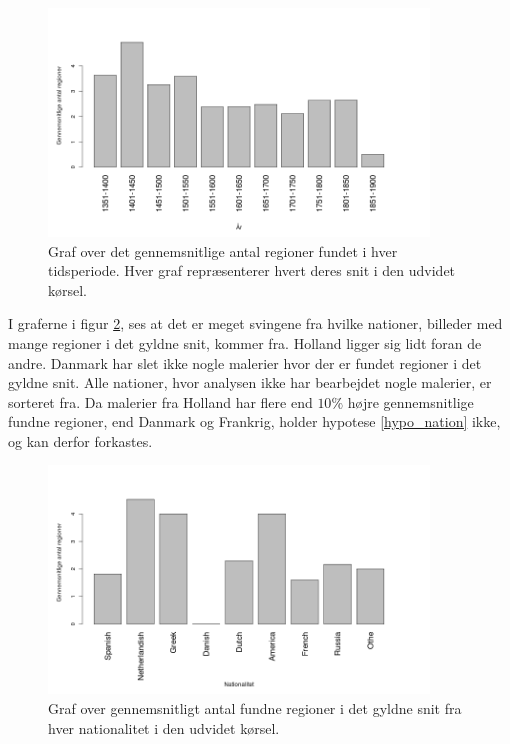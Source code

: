 {\begin{figure}[!h]
	\begin{center}
		\includegraphics[angle=0,width=0.90\textwidth]{afsnit/resultater/billeder/yearcutU.png}
	\end{center}
    \caption{Graf over det gennemsnitlige antal regioner fundet i hver
    tidsperiode. Hver graf repræsenterer hvert deres snit i den udvidet kørsel.}
	\label{udvidet_year}
\end{figure}

I graferne i figur \ref{udvidet_nation}, ses at det er meget svingene
fra hvilke nationer, billeder med mange regioner i det gyldne snit,
kommer fra. Holland ligger sig lidt foran de andre. Danmark har slet
ikke nogle malerier hvor der er fundet regioner i det gyldne snit. Alle
nationer, hvor analysen ikke har bearbejdet nogle malerier, er sorteret
fra. Da malerier fra Holland har flere end $10\%$ højre gennemsnitlige
fundne regioner, end Danmark og Frankrig, holder hypotese
\ref{hypo_nation} ikke, og kan derfor forkastes.

\begin{figure}[!h]
	\begin{center}
		\includegraphics[angle=0,width=0.90\textwidth]{afsnit/resultater/billeder/nationcutU.png}
	\end{center}
    \caption{Graf over gennemsnitligt antal fundne regioner i det gyldne
    snit fra hver nationalitet i den udvidet kørsel.}
	\label{udvidet_nation}
\end{figure}

}
